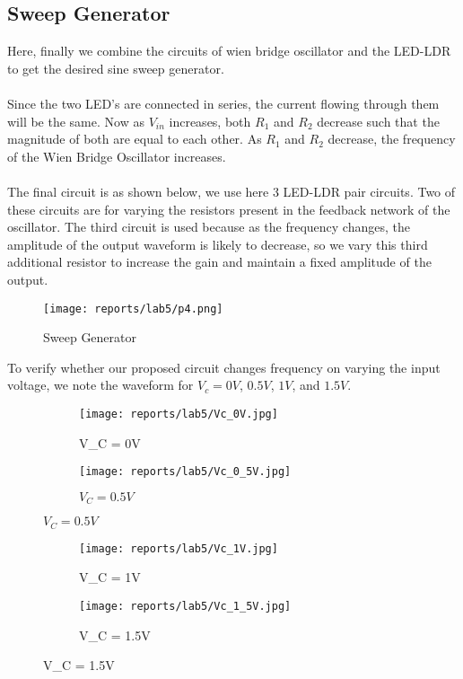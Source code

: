 \documentclass[12pt]{article}
\begin{document}
    \subsection{Sweep Generator}
    
        Here, finally we combine the circuits of wien bridge oscillator and the LED-LDR to get the desired sine sweep generator.\\\\
        \noindent
        Since the two LED's are connected in series, the current flowing through them will be the same. Now as $V_{in}$ increases, both $R_1$ and $R_2$ decrease such that the magnitude of both are equal to each other. As $R_1$ and $R_2$ decrease, the frequency of the Wien Bridge Oscillator increases. \\\\
        \noindent
        The final circuit is as shown below, we use here 3 LED-LDR pair circuits. Two of these circuits are for varying the resistors present in the feedback network of the oscillator. The third circuit is used because as the frequency changes, the amplitude of the output waveform is likely to decrease, so we vary this third additional resistor to increase the gain and maintain a fixed amplitude of the output. 
        \begin{figure}[H]
            \centering
            \texttt{[image: reports/lab5/p4.png]}
            \caption{Sweep Generator}
        \end{figure}
        \noindent
        To verify whether our proposed circuit changes frequency on varying the input voltage, we note the waveform for $V_c = 0V$, $0.5V$, $1V$, and $1.5V$.
        \begin{figure}[H]
            \centering
            \begin{subfigure}{.5\textwidth}
                \centering
                \texttt{[image: reports/lab5/Vc\_0V.jpg]}
                \caption{V_C = 0V}
            \end{subfigure}%
            \begin{subfigure}{.5\textwidth}
                \centering
                \texttt{[image: reports/lab5/Vc\_0\_5V.jpg]}
                \caption{$V_C = 0.5V$}
            \end{subfigure}%
        \end{figure}
        \begin{figure}[H]
            \centering
            \begin{subfigure}{.5\textwidth}
                \centering
                \texttt{[image: reports/lab5/Vc\_1V.jpg]}
                \caption{V_C = 1V}
            \end{subfigure}%
            \begin{subfigure}{.5\textwidth}
                \centering
                \texttt{[image: reports/lab5/Vc\_1\_5V.jpg]}
                \caption{V_C = 1.5V}
            \end{subfigure}%
        \end{figure}
        
\end{document}
